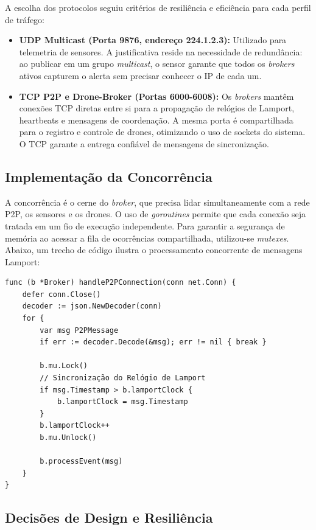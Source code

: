 A escolha dos protocolos seguiu critérios de resiliência e eficiência para cada perfil de tráfego:
\begin{itemize}
    \item \textbf{UDP Multicast (Porta 9876, endereço 224.1.2.3):} Utilizado para telemetria de sensores. A justificativa reside na necessidade de redundância: ao publicar em um grupo \textit{multicast}, o sensor garante que todos os \textit{brokers} ativos capturem o alerta sem precisar conhecer o IP de cada um.
    \item \textbf{TCP P2P e Drone-Broker (Portas 6000-6008):} Os \textit{brokers} mantêm conexões TCP diretas entre si para a propagação de relógios de Lamport, heartbeats e mensagens de coordenação. A mesma porta é compartilhada para o registro e controle de drones, otimizando o uso de sockets do sistema. O TCP garante a entrega confiável de mensagens de sincronização.
\end{itemize}

\subsection{Implementação da Concorrência}

A concorrência é o cerne do \textit{broker}, que precisa lidar simultaneamente com a rede P2P, os sensores e os drones. O uso de \textit{goroutines} permite que cada conexão seja tratada em um fio de execução independente. Para garantir a segurança de memória ao acessar a fila de ocorrências compartilhada, utilizou-se \textit{mutexes}. Abaixo, um trecho de código ilustra o processamento concorrente de mensagens Lamport:

\begin{verbatim}
func (b *Broker) handleP2PConnection(conn net.Conn) {
    defer conn.Close()
    decoder := json.NewDecoder(conn)
    for {
        var msg P2PMessage
        if err := decoder.Decode(&msg); err != nil { break }
        
        b.mu.Lock()
        // Sincronização do Relógio de Lamport
        if msg.Timestamp > b.lamportClock {
            b.lamportClock = msg.Timestamp
        }
        b.lamportClock++
        b.mu.Unlock()
        
        b.processEvent(msg)
    }
}
\end{verbatim}

\subsection{Decisões de Design e Resiliência}

